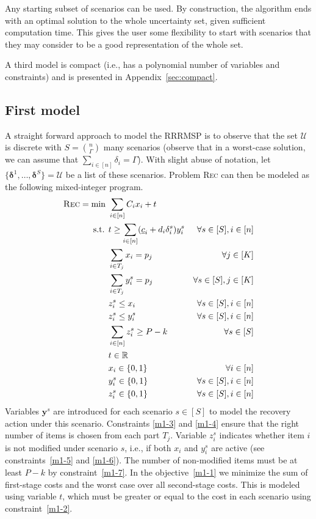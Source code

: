 \documentclass[a4paper,11pt,abstracton]{scrartcl}
\theoremstyle{definition}
\theoremstyle{remark}
\newcommand{\rr}{\mathbb{R}}
\newcommand{\cU}{\mathcal{U}}
\begin{document}
Any starting subset of scenarios can be used. By construction, the algorithm ends with an optimal solution to the whole uncertainty set, given sufficient computation time. This gives the user some flexibility to start with scenarios that they may consider to be a good representation of the whole set.

A third model is compact (i.e., has a polynomial number of variables and constraints) and is presented in Appendix~\ref{sec:compact}.

\subsection{First model}
\label{sec:first}

A straight forward approach to model the RRRMSP is to observe that the set $\cU$ is discrete with $S=\binom{n}{\Gamma}$ many scenarios (observe that in a worst-case solution, we can assume that $\sum_{i\in[n]} \delta_i = \Gamma$). With slight abuse of notation, let $\{ \pmb{\delta}^1,\ldots,\pmb{\delta}^S\} = \cU$ be a list of these scenarios. Problem \textsc{Rec} can then be modeled as the following mixed-integer program.
\begin{subequations}
\label{eq:m1}  
\begin{align}
\textsc{Rec} = \min\ & \sum_{i\in [n]} C_i x_i + t \label{m1-1} \\
\text{s.t. } & t \ge \sum_{i\in[n]} (\underline{c}_i + d_i\delta^s_i) y^s_i & \forall s\in[S], i\in[n] \label{m1-2} \\
& \sum_{i\in T_j} x_i = p_j & \forall j\in[K] \label{m1-3} \\
& \sum_{i\in T_j} y^s_i = p_j & \forall s\in[S], j\in[K] \label{m1-4} \\
& z^s_i \le x_i & \forall s\in[S], i\in[n] \label{m1-5} \\
& z^s_i \le y^s_i & \forall s\in[S], i\in[n] \label{m1-6} \\
& \sum_{i\in[n]} z^s_i \ge P-k & \forall s\in[S] \label{m1-7} \\
& t \in \rr \\
& x_i \in \{0,1\} & \forall i\in[n] \\
& y^s_i \in \{0,1\} & \forall s\in[S],i\in[n] \\
& z^s_i \in \{0,1\} & \forall s\in[S],i\in[n] \label{m1-end}
\end{align}
\end{subequations}
Variables $\pmb{y}^s$ are introduced for each scenario $s\in[S]$ to model the recovery action under this scenario. Constraints \eqref{m1-3} and \eqref{m1-4} ensure that the right number of items is chosen from each part $T_j$. Variable $z^s_i$ indicates whether item $i$ is not modified under scenario $s$, i.e., if both $x_i$ and $y^s_i$ are active (see constraints~\eqref{m1-5} and \eqref{m1-6}). The number of non-modified items must be at least $P-k$ by constraint~\eqref{m1-7}. In the objective~\eqref{m1-1} we minimize the sum of first-stage costs and the worst case over all second-stage costs. This is modeled using variable $t$, which must be greater or equal to the cost in each scenario using constraint~\eqref{m1-2}.
\end{document}
